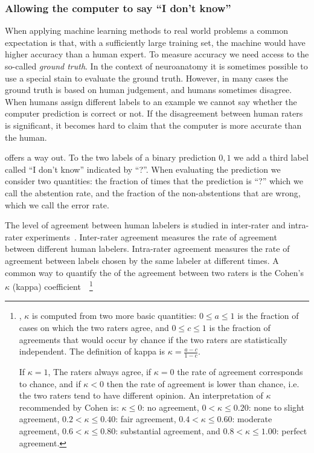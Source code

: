 \documentclass[11pt]{article}
\begin{document}
\subsubsection{Allowing the computer to say ``I don't know''}

When applying machine learning methods to real world problems a common 
expectation is that, with a sufficiently large training set, the
machine would have higher accuracy than a human expert. To measure
accuracy we need access to the so-called {\em ground truth}. In the
context of neuroanatomy it is sometimes possible to use a special
stain to evaluate the ground truth. However, in many cases the ground
truth is based on human judgement, and humans sometimes disagree. When
humans assign different labels to an example we cannot say whether the
computer prediction is correct or not. If the disagreement between
human raters is significant, it becomes hard to claim that the
computer is more accurate than the human.

\cite{Conformal} offers a way out. To the two labels of a binary prediction
$0,1$ we add a third label called ``I don't know'' indicated by
``?''. When evaluating the prediction we consider two quantities: the
fraction of times that the prediction is ``?'' which we call the
abstention rate, and the fraction of the non-abstentions that are
wrong, which we call the error rate.


The level of agreement between human labelers is studied in
inter-rater and intra-rater experiments~\cite{}. Inter-rater agreement
measures the rate of agreement between different human
labelers. Intra-rater agreement measures the rate of agreement between
labels chosen by the same labeler at different times.  A common way to
quantify the of the agreement between two raters is the Cohen's
$\kappa$ (kappa) coefficient~\cite{mchugh2012interrater}~\footnote{ ,
  $\kappa$ is computed from two more basic quantities: $0\leq a\leq 1$ is
  the fraction of cases on which the two raters agree, and
  $0\leq c\leq 1$ is the fraction of agreements that would occur by
  chance if the two raters are statistically independent.
  The definition of kappa is $\kappa=\frac{a-c}{1-c}$.

  If $\kappa=1$, The raters always agree, if $\kappa=0$ the rate of
  agreement corresponds to chance, and if $\kappa<0$ then the rate of
  agreement is lower than chance, i.e. the two raters tend to have
  different opinion. An interpretation of $\kappa$ recommended by
  Cohen \cite{mchugh2012interrater} is: $\kappa\leq 0$: no agreement,
  $0< \kappa\leq 0.20$: none to slight agreement,
  $0.2<\kappa\leq 0.40$: fair agreement, $0.4<\kappa\leq 0.60$:
  moderate agreement, $0.6<\kappa\leq 0.80$: substantial agreement,
  and $0.8<\kappa\leq 1.00$: perfect agreement.}
\end{document}
